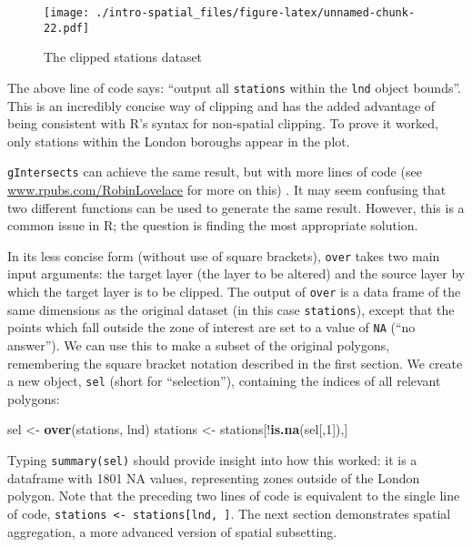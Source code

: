 \documentclass[]{article}
\newenvironment{Shaded}{}{}
\newcommand{\KeywordTok}[1]{\textcolor[rgb]{0.00,0.44,0.13}{\textbf{{#1}}}}
\newcommand{\DecValTok}[1]{\textcolor[rgb]{0.25,0.63,0.44}{{#1}}}
\newcommand{\StringTok}[1]{\textcolor[rgb]{0.25,0.44,0.63}{{#1}}}
\newcommand{\NormalTok}[1]{{#1}}
\begin{document}
\begin{figure}[htbp]
\centering
\texttt{[image: ./intro-spatial\_files/figure-latex/unnamed-chunk-22.pdf]}
\caption{The clipped stations dataset}
\end{figure}

The above line of code says: ``output all \texttt{stations} within the
\texttt{lnd} object bounds''. This is an incredibly concise way of
clipping and has the added advantage of being consistent with R's syntax
for non-spatial clipping. To prove it worked, only stations within the
London boroughs appear in the plot.

\texttt{gIntersects} can achieve the same result, but with more lines of
code (see
\href{http://www.rpubs.com/RobinLovelace/11796}{www.rpubs.com/RobinLovelace}
for more on this) . It may seem confusing that two different functions
can be used to generate the same result. However, this is a common issue
in R; the question is finding the most appropriate solution.

In its less concise form (without use of square brackets), \texttt{over}
takes two main input arguments: the target layer (the layer to be
altered) and the source layer by which the target layer is to be
clipped. The output of \texttt{over} is a data frame of the same
dimensions as the original dataset (in this case \texttt{stations}),
except that the points which fall outside the zone of interest are set
to a value of \texttt{NA} (``no answer''). We can use this to make a
subset of the original polygons, remembering the square bracket notation
described in the first section. We create a new object, \texttt{sel}
(short for ``selection''), containing the indices of all relevant
polygons:

\begin{Shaded}
\begin{Highlighting}[]
\NormalTok{sel <-}\StringTok{ }\KeywordTok{over}\NormalTok{(stations, lnd)}
\NormalTok{stations <-}\StringTok{ }\NormalTok{stations[!}\KeywordTok{is.na}\NormalTok{(sel[,}\DecValTok{1}\NormalTok{]),]}
\end{Highlighting}
\end{Shaded}

Typing \texttt{summary(sel)} should provide insight into how this
worked: it is a dataframe with 1801 NA values, representing zones
outside of the London polygon. Note that the preceding two lines of code
is equivalent to the single line of code,
\texttt{stations \textless{}- stations{[}lnd, {]}}. The next section
demonstrates spatial aggregation, a more advanced version of spatial
subsetting.
\end{document}

